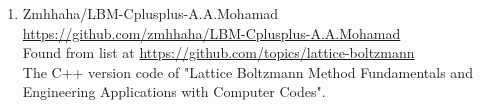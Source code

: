 \documentclass{article}
\begin{document}
\begin{enumerate}
\item Zmhhaha/LBM-Cplusplus-A.A.Mohamad
\\
\href{https://github.com/zmhhaha/LBM-Cplusplus-A.A.Mohamad}{https://github.com/zmhhaha/LBM-Cplusplus-A.A.Mohamad} \\
Found from list at \href{https://github.com/topics/lattice-boltzmann}{https://github.com/topics/lattice-boltzmann}\\
The C++ version code of "Lattice Boltzmann Method Fundamentals and Engineering Applications with Computer Codes".
	
\end{enumerate}
\end{document}
